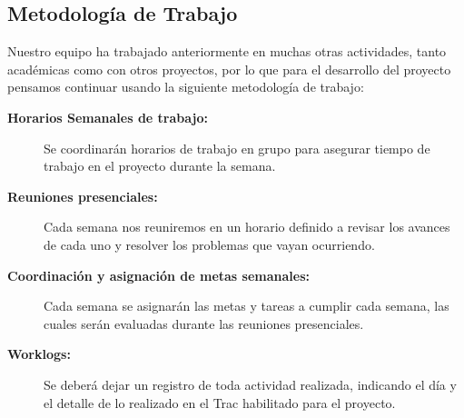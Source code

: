 
\subsection{Metodología de Trabajo}


Nuestro equipo ha trabajado anteriormente en muchas otras actividades, tanto académicas como con otros
proyectos, por lo que para el desarrollo del proyecto pensamos continuar usando la siguiente metodología
de trabajo:
\begin{description}
	\item[\textbf{Horarios Semanales de trabajo:}] 
		Se coordinarán horarios de trabajo en grupo para asegurar tiempo de trabajo en el proyecto
		durante la semana.

	\item[\textbf{Reuniones presenciales:}]
		Cada semana nos reuniremos en un horario definido a revisar los avances de cada uno y resolver
		los problemas que vayan ocurriendo.

	\item[\textbf{Coordinación y asignación de metas semanales:}]
		Cada semana se asignarán las metas y tareas a cumplir cada semana, las cuales serán evaluadas
		durante las reuniones presenciales.

	\item[\textbf{Worklogs:}]
		Se deberá dejar un registro de toda actividad realizada, indicando el día y
		el detalle de lo realizado en el Trac habilitado para el proyecto.

\end{description}



